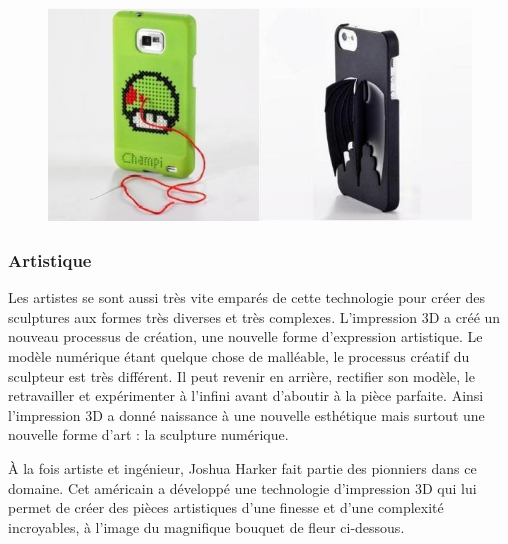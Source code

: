 \documentclass{article}
\begin{document}
\begin{figure}[h!]
\centering
\includegraphics[scale=0.4]{./images/coque.png}
\end{figure}\hfill

\subsubsection{Artistique}

Les artistes se sont aussi très vite emparés de cette technologie pour créer des sculptures aux formes très diverses et très complexes. L'impression 3D a créé un nouveau processus de création, une nouvelle forme d'expression artistique. Le modèle numérique étant quelque chose de malléable, le processus créatif du sculpteur est très différent. Il peut revenir en arrière, rectifier son modèle, le retravailler et expérimenter à l'infini avant d'aboutir à la pièce parfaite. Ainsi l'impression 3D a donné naissance à une nouvelle esthétique mais surtout une nouvelle forme d'art : la sculpture numérique.\hfill
 \par\leavevmode\par
À la fois artiste et ingénieur, Joshua Harker fait partie des pionniers dans ce domaine. Cet américain a développé une technologie d'impression 3D qui lui permet de créer des pièces artistiques d'une finesse et d'une complexité incroyables, à l'image du magnifique bouquet de fleur ci-dessous.
\end{document}
